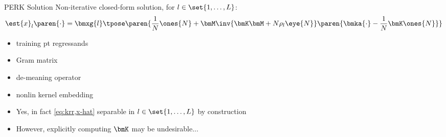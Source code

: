 \begin{frame}{PERK Solution}
	Non-iterative closed-form solution, for $l \in \set{1,\dots,L}$: 
	\begin{align}
		\est{x}_l\paren{\cdot} = \bmxg{l}\tpose\paren{
			\frac{1}{N}\ones{N} 
			+ \bmM\inv{\bmK\bmM + N\rho_l \eye{N}} 
			\paren{\bmka{\cdot} - \frac{1}{N}\bmK\ones{N}}
		}
		\label{eq:krr,x-hat}
	\end{align}
	\begin{itemize}
	\item<1-4>{%
		training pt regressands
	}
	\item<2-4,6>{%
		Gram matrix
	}						
	\item<3-4>{%
		de-meaning operator
	}
	\item<4>{%
		nonlin kernel embedding
	}
	\end{itemize}
	\begin{itemize}
		\item<5>{Yes, in fact \eqref{eq:krr,x-hat} separable in $l \in \set{1,\dots,L}$ by construction}
		\item<6>{However, explicitly computing $\bmK$ may be undesirable...}
	\end{itemize}
\end{frame}

